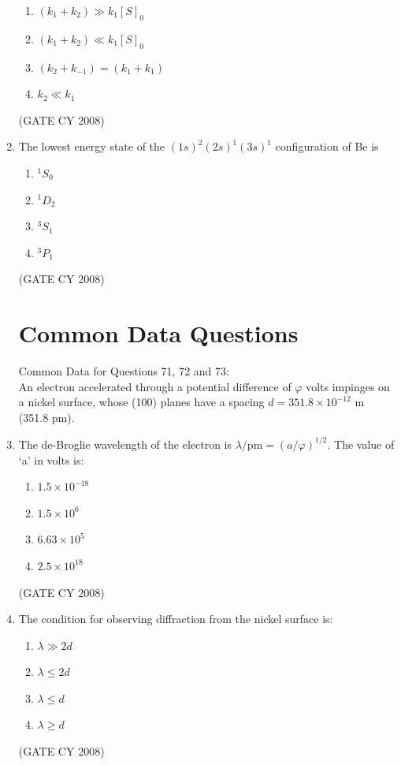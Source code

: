 \documentclass[12pt]{article}
\begin{document}
\begin{enumerate}
\begin{enumerate}
\item   $(k_1 + k_2) \gg k_1 [S]_0$
\item   $(k_1 + k_2) \ll k_1 [S]_0$ 
\item   $(k_2 + k_{-1}) = (k_1 + k_1)$ 
\item   $k_2 \ll k_1$
\end{enumerate}    \hfill{(GATE CY 2008)}


\item The lowest energy state of the $(1s)^2(2s)^1(3s)^1$ configuration of Be is

\begin{enumerate}
\item $^1S_0$
\item $^1D_2$
\item $^3S_1$
\item $^3P_1$
\end{enumerate}    \hfill{(GATE CY 2008)}



\section*{Common Data Questions}

{Common Data for Questions 71, 72 and 73:} \\
An electron accelerated through a potential difference of $\varphi$ volts impinges on a nickel surface, whose (100) planes have a spacing $d = 351.8 \times 10^{-12}$ m (351.8 pm).


    \item The de-Broglie wavelength of the electron is $\lambda/\text{pm} = (a/\varphi)^{1/2}$. The value of ‘a’ in volts is:
    \begin{enumerate}
        \item $1.5 \times 10^{-18}$
        \item $1.5 \times 10^6$
        \item $6.63 \times 10^5$
        \item $2.5 \times 10^{18}$
    \end{enumerate}    \hfill{(GATE CY 2008)}


    \item The condition for observing diffraction from the nickel surface is:
    \begin{enumerate}
        \item $\lambda \gg 2d$
        \item $\lambda \leq 2d$
        \item $\lambda \leq d$
        \item $\lambda \geq d$
    \end{enumerate}    \hfill{(GATE CY 2008)}



\end{enumerate}
\end{document}
